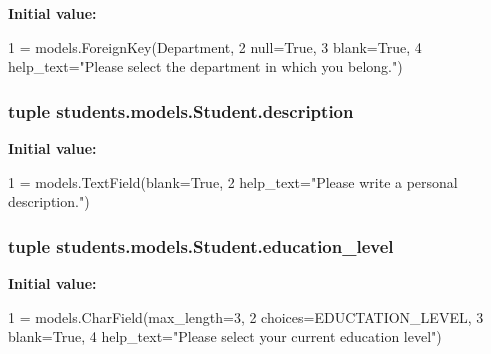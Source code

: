 {\bfseries Initial value\-:}
\begin{DoxyCode}
1 = models.ForeignKey(Department,
2                                    null=\textcolor{keyword}{True},
3                                    blank=\textcolor{keyword}{True},
4                                    help\_text=\textcolor{stringliteral}{"Please select the department in which you belong."})
\end{DoxyCode}
\hypertarget{classstudents_1_1models_1_1_student_a56967491948903227152a9fa074c9546}{
\subsubsection[{description}]{\setlength{\rightskip}{0pt plus 5cm}tuple students.\-models.\-Student.\-description\hspace{0.3cm}{\ttfamily [static]}}}\label{classstudents_1_1models_1_1_student_a56967491948903227152a9fa074c9546}
{\bfseries Initial value\-:}
\begin{DoxyCode}
1 = models.TextField(blank=\textcolor{keyword}{True},
2                                    help\_text=\textcolor{stringliteral}{"Please write a personal description."})
\end{DoxyCode}
\hypertarget{classstudents_1_1models_1_1_student_a43909b3b49d600bfb53f10286a838fe0}{
\subsubsection[{education\-\_\-level}]{\setlength{\rightskip}{0pt plus 5cm}tuple students.\-models.\-Student.\-education\-\_\-level\hspace{0.3cm}{\ttfamily [static]}}}\label{classstudents_1_1models_1_1_student_a43909b3b49d600bfb53f10286a838fe0}
{\bfseries Initial value\-:}
\begin{DoxyCode}
1 = models.CharField(max\_length=3,
2                                        choices=EDUCTATION\_LEVEL,
3                                        blank=\textcolor{keyword}{True},
4                                        help\_text=\textcolor{stringliteral}{"Please select your current education level"})
\end{DoxyCode}
